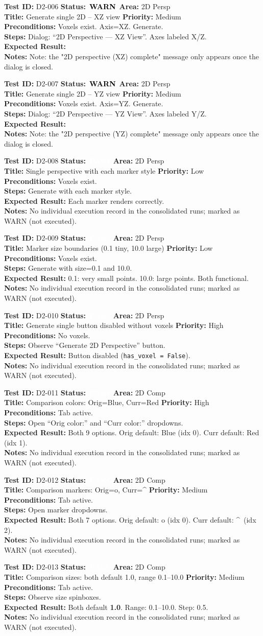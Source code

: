 \documentclass[12pt,a4paper]{article}
\newcommand{\statuspass}{\colorbox{statusgreen}{\textcolor{white}{\textbf{\,PASS\,}}}}
\newcommand{\statuswarn}{\colorbox{statusyellow}{\textcolor{black}{\textbf{\,WARN\,}}}}
\newcommand{\testcase}[9]{%
  \smallskip
  \noindent\textbf{Test ID:} #1 \hfill \textbf{Status:} #2 \hfill \textbf{Area:} #3 \\
  \textbf{Title:} #4 \hfill \textbf{Priority:} #5 \\[0.3em]
  \textbf{Preconditions:} #6 \\[0.3em]
  \textbf{Steps:} #7 \\[0.3em]
  \textbf{Expected Result:} #8 \\
  \textbf{Notes:} #9
  \smallskip
}
\begin{document}
\testcase{D2-006}{\statuswarn}{2D Persp}{Generate single 2D -- XZ view}{Medium}{Voxels exist. Axis=XZ. Generate.}{Dialog: ``2D Perspective --- XZ View''. Axes labeled X/Z.}{}{Note: the "2D perspective (XZ) complete" message only appears once the dialog is closed.}


\testcase{D2-007}{\statuswarn}{2D Persp}{Generate single 2D -- YZ view}{Medium}{Voxels exist. Axis=YZ. Generate.}{Dialog: ``2D Perspective --- YZ View''. Axes labeled Y/Z.}{}{Note: the "2D perspective (YZ) complete" message only appears once the dialog is closed.}


\testcase{D2-008}{\statuspass}{2D Persp}{Single perspective with each marker style}{Low}{Voxels exist.}{Generate with each marker style.}{Each marker renders correctly.}{No individual execution record in the consolidated runs; marked as WARN (not executed).}


\testcase{D2-009}{\statuspass}{2D Persp}{Marker size boundaries (0.1 tiny, 10.0 large)}{Low}{Voxels exist.}{Generate with size=0.1 and 10.0.}{0.1: very small points. 10.0: large points. Both functional.}{No individual execution record in the consolidated runs; marked as WARN (not executed).}


\testcase{D2-010}{\statuspass}{2D Persp}{Generate single button disabled without voxels}{High}{No voxels.}{Observe ``Generate 2D Perspective'' button.}{Button disabled (\texttt{has\_voxel = False}).}{No individual execution record in the consolidated runs; marked as WARN (not executed).}


\testcase{D2-011}{\statuspass}{2D Comp}{Comparison colors: Orig=Blue, Curr=Red}{High}{Tab active.}{Open ``Orig color:'' and ``Curr color:'' dropdowns.}{Both 9 options. Orig default: Blue (idx 0). Curr default: Red (idx 1).}{No individual execution record in the consolidated runs; marked as WARN (not executed).}


\testcase{D2-012}{\statuspass}{2D Comp}{Comparison markers: Orig=o, Curr=\textasciicircum}{Medium}{Tab active.}{Open marker dropdowns.}{Both 7 options. Orig default: o (idx 0). Curr default: \textasciicircum\ (idx 2).}{No individual execution record in the consolidated runs; marked as WARN (not executed).}


\testcase{D2-013}{\statuspass}{2D Comp}{Comparison sizes: both default 1.0, range 0.1--10.0}{Medium}{Tab active.}{Observe size spinboxes.}{Both default \textbf{1.0}. Range: 0.1--10.0. Step: 0.5.}{No individual execution record in the consolidated runs; marked as WARN (not executed).}
\end{document}
